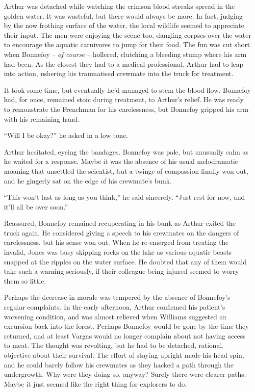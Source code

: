 Arthur was detached while watching the crimson blood streaks spread in the golden water. It was wasteful, but there would always be more. In fact, judging by the now frothing surface of the water, the local wildlife seemed to appreciate their input. The men were enjoying the scene too, dangling corpses over the water to encourage the aquatic carnivores to jump for their food. The fun was cut short when Bonnefoy – \textit{of course} – hollered, clutching a bleeding stump where his arm had been. As the closest they had to a medical professional, Arthur had to leap into action, ushering his traumatised crewmate into the truck for treatment. 

It took some time, but eventually he’d managed to stem the blood flow. Bonnefoy had, for once, remained stoic during treatment, to Arthur’s relief. He was ready to remonstrate the Frenchman for his carelessness, but Bonnefoy gripped his arm with his remaining hand. 

“Will I be okay?” he asked in a low tone. 

Arthur hesitated, eyeing the bandages. Bonnefoy was pale, but unusually calm as he waited for a response. Maybe it was the absence of his usual melodramatic moaning that unsettled the scientist, but a twinge of compassion finally won out, and he gingerly sat on the edge of his crewmate’s bunk. 

“This won’t last as long as you think,” he said sincerely. “Just rest for now, and it’ll all be over soon.” 

Reassured, Bonnefoy remained recuperating in his bunk as Arthur exited the truck again. He considered giving a speech to his crewmates on the dangers of carelessness, but his sense won out. When he re-emerged from treating the invalid, Jones was busy skipping rocks on the lake as various aquatic beasts snapped at the ripples on the water surface. He doubted that any of them would take such a warning seriously, if their colleague being injured seemed to worry them so little. 

Perhaps the decrease in morale was tempered by the absence of Bonnefoy’s regular complaints. In the early afternoon, Arthur confirmed his patient’s worsening condition, and was almost relieved when Williams suggested an excursion back into the forest. Perhaps Bonnefoy would be gone by the time they returned, and at least Vargas would no longer complain about not having access to meat. The thought was revolting, but he had to be detached, rational, objective about their survival. The effort of staying upright made his head spin, and he could barely follow his crewmates as they hacked a path through the undergrowth. Why were they doing so, anyway? Surely there were clearer paths. Maybe it just seemed like the right thing for explorers to do. 

